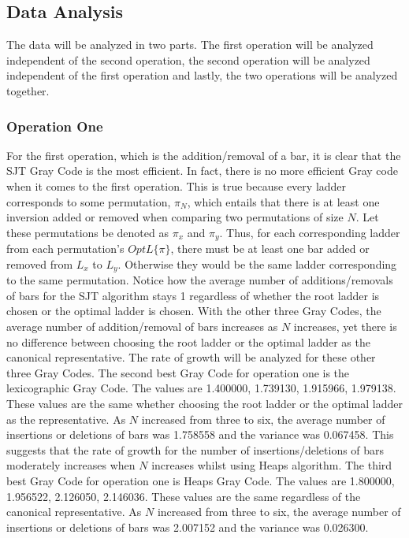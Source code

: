 \subsection{Data Analysis}
The data will be analyzed in two parts. The first operation will be analyzed independent 
of the second operation, the second operation will be analyzed independent of the first operation 
and lastly, the two operations will be analyzed together.\par 
\subsubsection{Operation One}
For the first operation, which is the addition/removal of a bar, it is clear that the SJT Gray Code 
is the most efficient. In fact, there is no more efficient Gray code when it comes to the first operation.
This is true because every ladder corresponds to some permutation, $\pi_{N}$, which entails 
that there is at least one inversion added or removed when comparing two permutations of size $N$. 
Let these permutations be denoted as $\pi_{x}$ and $\pi_{y}$.
Thus, for each corresponding ladder from each permutation's $OptL\{\pi\}$, there must be at least 
one bar added or removed from $L_{x}$ to $L_{y}$. Otherwise they would be the same ladder corresponding 
to the same permutation. Notice how the average number of additions/removals of bars for the SJT algorithm 
stays 1 regardless of whether the root ladder is chosen or the optimal ladder is chosen. With the other three 
Gray Codes, the average number of addition/removal of bars increases as $N$ increases, yet there is no 
difference between choosing the root ladder or the optimal ladder as the canonical representative.
The rate of growth will be analyzed for these other three Gray Codes. The second best Gray Code for operation 
one is the lexicographic Gray Code. The values are
1.400000, 1.739130, 1.915966, 1.979138. These values are the same whether choosing the root ladder or 
the optimal ladder as the representative. As $N$ increased from three to six, 
the average number of insertions or deletions of bars was 1.758558 and the variance was 0.067458.
This suggests that the rate of growth for the number of insertions/deletions of bars moderately increases when $N$ increases whilst 
using Heaps algorithm. The third best Gray Code for operation one is Heaps Gray Code.
The values are 1.800000, 1.956522, 2.126050, 2.146036.
These values are the same regardless of the canonical representative. As $N$ increased from three to six, 
the average number of insertions or deletions of bars was 2.007152 and the variance was 0.026300.
